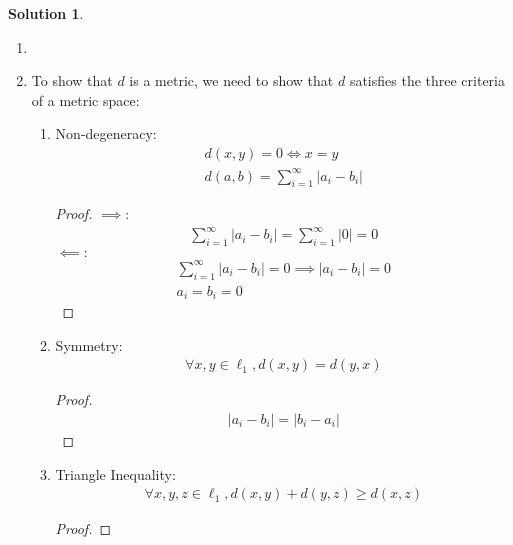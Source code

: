 \documentclass[12pt]{article}
\theoremstyle{definition} %
\newtheorem{solution}{Solution}
\theoremstyle{plain} %
\begin{document}
\begin{solution}
        \begin{enumerate}
            \item \item To show that $d$ is a metric, we need to show that $d$ satisfies the three criteria of a metric space:
            \begin{enumerate}
                \item Non-degeneracy:
                \begin{align}
                  d(x,y)=0 \iff x=y \\[10pt] 
                  d(a,b) = \sum_{i=1}^{\infty} \left\vert a_i - b_{i} \right\vert  
                \end{align} 
                \begin{proof}
                    $\implies:$ 
                    \begin{align}
                        \sum_{i=1}^{\infty} \left\vert a_{i}-b_{i} \right\vert = \sum_{i=1}^{\infty} \left\vert 0 \right\vert =0 
                    \end{align} 
                    $\impliedby:$ 
                    \begin{align}
                        \sum_{i=1}^{\infty} \left\vert a_{i}-b_{i} \right\vert =0 \implies \left\vert a_{i}-b_{i} \right\vert =0 \\[10pt] 
                        a_{i}=b_{i}=0
                    \end{align}
                \end{proof}
                \item Symmetry:
                \begin{align}
                    \forall x,y \in \ell_1, d(x,y)=d(y,x) 
                \end{align}
                \begin{proof}
                    \begin{align}
                        \left\vert a_{i}-b_{i} \right\vert =\left\vert b_{i}-a_{i} \right\vert 
                    \end{align}
                \end{proof}
                \item Triangle Inequality: 
                \begin{align}
                    \forall x,y,z \in \ell_1, d(x,y)+d(y,z)\geq d(x,z)
                \end{align} 
                    \begin{proof}

\end{proof}
\end{enumerate}
\end{enumerate}
\end{solution}
\end{document}
